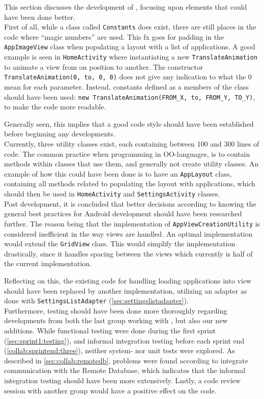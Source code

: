 This section discusses the development of \launcher, focusing upon elements that could have been done better.\\

First of all, while a class called \lstinline|Constants| does exist, there are still places in the code where ``magic numbers'' are used.
This fx goes for padding in the \lstinline|AppImageView| class when populating a layout with a list of applications.
A good example is seen in \lstinline|HomeActivity| where instantiating a new \lstinline|TranslateAnimation| to animate a view from on position to another.
The constructor \lstinline|TranslateAnimation(0, to, 0, 0)| does not give any indication to what the 0 mean for each parameter.
Instead, constants defined as a members of the class should have been used: \lstinline|new TranslateAnimation(FROM_X, to, FROM_Y, TO_Y)|, to make the code more readable.

Generally seen, this implies that a good code style should have been established before beginning any developments.
\\

Currently, three utility classes exist, each containing between 100 and 300 lines of code.
The common practice when programming in OO-languages, is to contain methods within classes that use them, and generally not create utility classes.
An example of how this could have been done is to have an \lstinline|AppLayout| class, containing all methods related to populating the layout with applications, which should then be used in \lstinline|HomeActivity| and \lstinline|SettingsActivity| classes.\\


Post development, it is concluded that better decisions according to knowing the general best practices for Android development should have been researched further.
The reason being that the implementation of \lstinline|AppViewCreationUtility| is considered inefficient in the way views are handled.
An optimal implementation would extend the \lstinline|GridView| class.
This would simplify the implementation drastically, since it handles spacing between the views which currently is half of the current implementation.

Reflecting on this, the existing code for handling loading applications into view should have been replaced by another implementation, utilizing an adapter as done with \lstinline|SettingsListAdapter| (\cref{sec:settingslistadapter}).\\

Furthermore, testing should have been done more thoroughly regarding developments from both the last group working with \launcher, but also our new additions.
While functional testing were done during the first sprint (\cref{sec:sprint1:testing}), and informal integration testing before each sprint end (\cref{collab:sprintend:three}), neither system- nor unit tests were explored.
As described in \cref{sec:collab:remotedb}, problems were found according to integrate communication with the Remote Database, which indicates that the informal integration testing should have been more extensively.
Lastly, a code review session with another group would have a positive effect on the code.